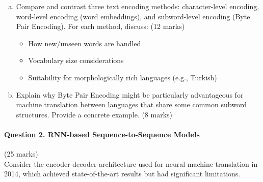 \documentclass[12pt]{article}
\newcommand{\mediumanswer}{\vspace{3cm}}         %
\newcommand{\journalspace}{\vspace{4.5cm}}       %
\begin{document}
\begin{enumerate}[(a)]
    \item Compare and contrast three text encoding methods: character-level encoding, word-level encoding (word embeddings), and subword-level encoding (Byte Pair Encoding). For each method, discuss: \hfill (12 marks)
    \begin{itemize}
        \item How new/unseen words are handled
        \item Vocabulary size considerations
        \item Suitability for morphologically rich languages (e.g., Turkish)
    \end{itemize}
    
    \journalspace
    
    \item Explain why Byte Pair Encoding might be particularly advantageous for machine translation between languages that share some common subword structures. Provide a concrete example. \hfill (8 marks)
    
    \mediumanswer
\end{enumerate}

\newpage
\paragraph{Question 2. RNN-based Sequence-to-Sequence Models}\hfill (25 marks)\\
Consider the encoder-decoder architecture used for neural machine translation in 2014, which achieved state-of-the-art results but had significant limitations.
\end{document}
